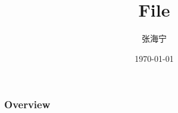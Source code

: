 \documentclass{beamer}
\title[File]{File} %
\author{张海宁} %
\institute[贵大计算机] %
{
贵州大学 \\ %
\medskip
\textit{hnzhang1@gzu.edu.cn} %
}
\date{\today} %
\begin{document}
\begin{frame}
\titlepage %
\end{frame}

\begin{frame}
\frametitle{Overview} %
\tableofcontents %
\end{frame}


\end{document}
